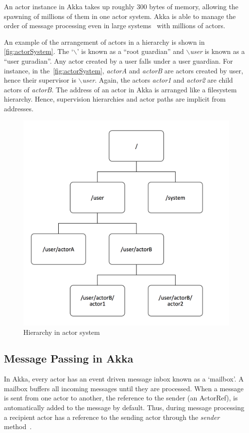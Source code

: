   An actor instance in Akka takes up roughly 300 bytes of memory, allowing the spawning of millions of them in one actor system. Akka is able to manage the order of message processing even in large systems~\cite{akkaJavaDoc} with millions of actors.

  An example of the arrangement of actors in a hierarchy is shown in \autoref{fig:actorSystem}. The ‘{$\backslash$}’ is known as a “root guardian” and \emph{$\backslash$user} is known as a “user guradian”. Any actor created by a user falls under a user guardian. For instance, in the~\autoref{fig:actorSystem}, \emph{actorA} and \emph{actorB} are actors created by user, hence their supervisor is \emph{$\backslash$user}. Again, the actors \emph{actor1} and \emph{actor2} are child actors of \emph{actorB}. The address of an actor in Akka is arranged like a filesystem hierarchy. Hence, supervision hierarchies and actor paths are implicit from addresses.

\begin{figure}[H]
  \centering
  \includegraphics[scale=0.5]{figures/actorSystem}
  \caption[Hierarchy in actor system]{Hierarchy in actor system~\cite{akkaJavaDoc}}
  \label{fig:actorSystem}
\end{figure}

  \subsection{Message Passing in Akka}
  \label{subsec:akkaMessagePassing}
  In Akka, every actor has an event driven message inbox known as a ‘mailbox’. A mailbox buffers all incoming messages until they are processed. When a message is sent from one actor to another, the reference to the sender (an ActorRef), is automatically added to the message by default. Thus, during message processing a recipient actor has a reference to the sending actor through the \emph{sender} method~\cite{akkaJavaDoc}.

